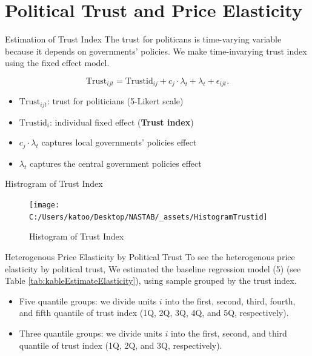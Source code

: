 \documentclass[
  ignorenonframetext,
]{beamer}
\providecommand{\tightlist}{%
  \setlength{\itemsep}{0pt}\setlength{\parskip}{0pt}}
\begin{document}
\hypertarget{political-trust-and-price-elasticity}{%
\section{Political Trust and Price
Elasticity}\label{political-trust-and-price-elasticity}}

\begin{frame}{Estimation of Trust Index}
\protect\hypertarget{estimation-of-trust-index}{}
The trust for politicans is time-varying variable because it depends on
governments' policies. We make time-invarying trust index using the
fixed effect model.

\[
    \text{Trust}_{ijt} = \text{Trustid}_{ij} + c_j \cdot \lambda_t + \lambda_t + \epsilon_{ijt}.
\]

\begin{itemize}
\tightlist
\item
  \(\text{Trust}_{ijt}\): trust for politicians (5-Likert scale)
\item
  \(\text{Trustid}_i\): individual fixed effect (\textbf{Trust index})
\item
  \(c_j \cdot \lambda_t\) captures local governments' policies effect
\item
  \(\lambda_t\) captures the central government policies effect
\end{itemize}
\end{frame}

\begin{frame}{Histrogram of Trust Index}
\protect\hypertarget{histrogram-of-trust-index}{}
\begin{figure}
\texttt{[image: C:/Users/katoo/Desktop/NASTAB/\_assets/HistogramTrustid]} \caption{Histogram of Trust Index}\label{fig:unnamed-chunk-3}
\end{figure}
\end{frame}

\begin{frame}{Heterogenous Price Elasticity by Political Trust}
\protect\hypertarget{heterogenous-price-elasticity-by-political-trust}{}
To see the heterogenous price elasticity by political trust, We
estimated the baseline regression model (5) (see Table
\ref{tab:kableEstimateElasticity}), using sample grouped by the trust
index.

\begin{itemize}
\tightlist
\item
  Five quantile groups: we divide units \(i\) into the first, second,
  third, fourth, and fifth quantile of trust index (1Q, 2Q, 3Q, 4Q, and
  5Q, respectively).
\item
  Three quantile groups: we divide units \(i\) into the first, second,
  and third quantile of trust index (1Q, 2Q, and 3Q, respectively).
\end{itemize}
\end{frame}
\end{document}
